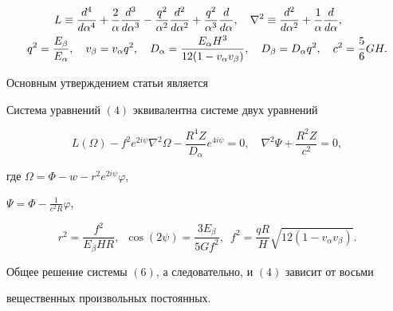 \begin{equation} 


\begin{split} 


L\equiv\myfrac{^4}{^4}&+\frac{2}{\alpha}\myfrac{^3}{^3}- 


\frac{q^2}{\alpha^2}\myfrac{^2}{^2}+\frac{q^2}{\alpha^3}\myfrac{}{}, 


\quad \nabla^2\equiv\myfrac{^2}{^2}+\frac{1}{\alpha}\myfrac{}{}, \\ 


%


q^2=\frac{E_\beta}{E_\alpha},\quad v_\beta&=v_\alpha q^2,\quad 


D_\alpha=\frac{E_\alpha H^3}{12(1-v_\alpha v_\beta)},\quad 


D_\beta=D_\alpha q^2,\quad c^2=\frac{5}{6}G H. 


\end{split} 


\end{equation} 


 


Основным утверждением статьи является 


 


\begin{thmnonum} 


Система уравнений $(4)$ эквивалентна системе двух уравнений 


\begin{equation} 


L(\Omega)-f^2e^{2i\psi}\nabla^2\Omega- 


\frac{R^4Z}{D_\alpha}e^{4i\psi}=0,\quad 


\nabla^2\Psi+\frac{R^2Z}{c^2}=0, 


\end{equation} 


где $\Omega=\Phi-w-r^2e^{2i\psi}\varphi$,


$\Psi=\Phi-\frac{1}{c^2R}\varphi$,


\begin{equation} 


r^2=\frac{f^2}{E_\beta H R},\ \;


\cos(2\psi)=\frac{3E_\beta}{5G f^2},\ \;


f^2=\frac{q R}{H}\sqrt{12(1-v_\alpha v_\beta)}. 


\end{equation} 


Общее решение системы $(6)$, а следовательно, и $(4)$ зависит от восьми 


вещественных произвольных постоянных. 


\end{thmnonum} 


